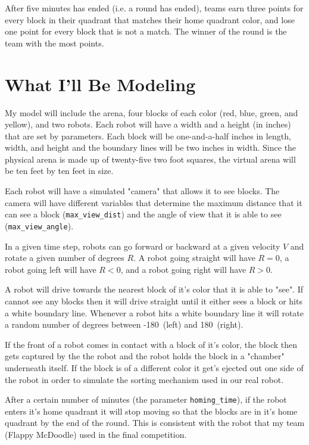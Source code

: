 \documentclass[12pt]{article}
\begin{document}
After five minutes has ended (i.e. a round has ended), teams earn three points for every block in their quadrant that matches their home quadrant color, and lose one point for every block that is not a match. The winner of the round is the team with the most points.

\section{What I'll Be Modeling}
My model will include the arena, four blocks of each color (red, blue, green, and yellow), and two robots. Each robot will have a width and a height (in inches) that are set by parameters. Each block will be one-and-a-half inches in length, width, and height and the boundary lines will be two inches in width. Since the physical arena is made up of twenty-five two foot squares, the virtual arena will be ten feet by ten feet in size.

Each robot will have a simulated "camera" that allows it to see blocks. The camera will have different variables that determine the maximum distance that it can see a block (\texttt{max\_view\_dist}) and the angle of view that it is able to see (\texttt{max\_view\_angle}).

In a given time step, robots can go forward or backward at a given velocity $V$ and rotate a given number of degrees $R$. A robot going straight will have $R = 0$, a robot going left will have $R < 0$, and a robot going right will have $R > 0$.

A robot will drive towards the nearest block of it's color that it is able to "see". If cannot see any blocks then it will drive straight until it either sees a block or hits a white boundary line. Whenever a robot hits a white boundary line it will rotate a random number of degrees between -180\degree\ (left) and 180\degree\ (right). 

If the front of a robot comes in contact with a block of it's color, the block then gets captured by the the robot and the robot holds the block in a "chamber" underneath itself. If the block is of a different color it get's ejected out one side of the robot in order to simulate the sorting mechanism used in our real robot.

After a certain number of minutes (the parameter \texttt{homing\_time}), if the robot enters it's home quadrant it will stop moving so that the blocks are in it's home quadrant by the end of the round. This is consistent with the robot that my team (Flappy McDoodle) used in the final competition.
\end{document}
